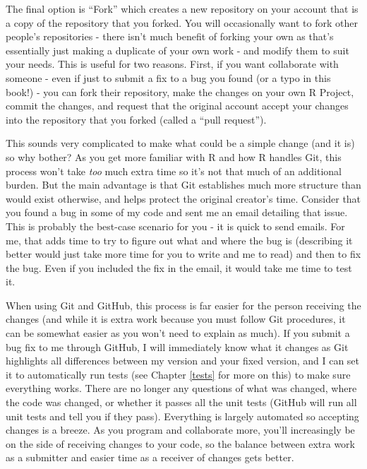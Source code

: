 \documentclass[
]{krantz}
\begin{document}
The final option is ``Fork'' which creates a new repository
on your account that is a copy of the repository that you
forked. You will occasionally want to fork other people's
repositories - there isn't much benefit of forking your own
as that's essentially just making a duplicate of your own
work - and modify them to suit your needs. This is useful
for two reasons. First, if you want collaborate with someone
- even if just to submit a fix to a bug you found (or a typo
in this book!) - you can fork their repository, make the
changes on your own R Project, commit the changes, and
request that the original account accept your changes into
the repository that you forked (called a ``pull request'').

This sounds very complicated to make what could be a simple
change (and it is) so why bother? As you get more familiar
with R and how R handles Git, this process won't take
\emph{too} much extra time so it's not that much of an
additional burden. But the main advantage is that Git
establishes much more structure than would exist otherwise,
and helps protect the original creator's time. Consider that
you found a bug in some of my code and sent me an email
detailing that issue. This is probably the best-case
scenario for you - it is quick to send emails. For me, that
adds time to try to figure out what and where the bug is
(describing it better would just take more time for you to
write and me to read) and then to fix the bug. Even if you
included the fix in the email, it would take me time to test
it.

When using Git and GitHub, this process is far easier for
the person receiving the changes (and while it is extra work
because you must follow Git procedures, it can be somewhat
easier as you won't need to explain as much). If you submit
a bug fix to me through GitHub, I will immediately know what
it changes as Git highlights all differences between my
version and your fixed version, and I can set it to
automatically run tests (see Chapter \ref{tests} for more on
this) to make sure everything works. There are no longer any
questions of what was changed, where the code was changed,
or whether it passes all the unit tests (GitHub will run all
unit tests and tell you if they pass). Everything is largely
automated so accepting changes is a breeze. As you program
and collaborate more, you'll increasingly be on the side of
receiving changes to your code, so the balance between extra
work as a submitter and easier time as a receiver of changes
gets better.
\end{document}
